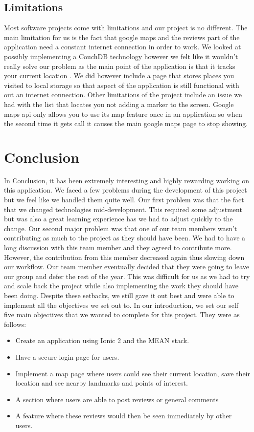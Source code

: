 \section{Limitations}
Most software projects come with limitations and our project is no different. The main limitation for us is the fact that google maps and the reviews part of the application need a constant internet connection in order to work. We looked at possibly implementing a CouchDB technology however we felt like it wouldn't really solve our problem as the main point of the application is that it tracks your current location \cite{couchdb}. We did however include a page that stores places you visited to local storage so that aspect of the application is still functional with out an internet connection.
Other limitations of the project include an issue we had with the list that locates you not adding a marker to the screen. Google maps api only allows you to use its map feature once in an application so when the second time it gets call it causes the main google maps page to stop showing.


\chapter{Conclusion}

In Conclusion, it has been extremely interesting and highly rewarding working on this application. We faced a few problems during the development of this project but we feel like we handled them quite well. Our first problem was that the fact that we changed technologies mid-development. This required some adjustment but was also a great learning experience has we had to adjust quickly to the change. Our second major problem was that one of our team members wasn't contributing as much to the project as they should have been. We had to have a long discussion with this team member and they agreed to contribute more. However, the contribution from this member decreased again thus slowing down our workflow. Our team member eventually decided that they were going to leave our group and defer the rest of the year. This was difficult for us as we had to try and scale back the project while also implementing the work they should have been doing. Despite these setbacks, we still gave it out best and were able to implement all the objectives we set out to. In our introduction, we set our self five main objectives that we wanted to complete for this project. They were as follows:

\begin{itemize}
	\item Create an application using Ionic 2 and the MEAN stack.
	\item Have a secure login page for users.
	\item Implement a map page where users could see their current location, save their location and see nearby landmarks and points of interest.
	\item A section where users are able to post reviews or general comments
	\item A feature where these reviews would then be seen immediately by other users. 
\end{itemize}

